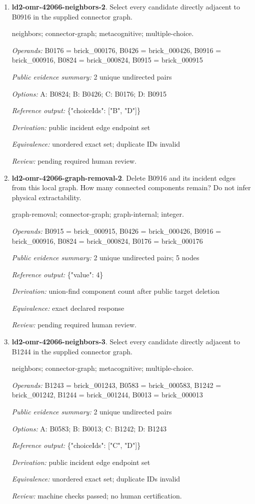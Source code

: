 \begin{enumerate}
\item \textbf{ld2-omr-42066-neighbors-2}. Select every candidate directly adjacent to B0916 in the supplied connector graph.
\par{\small neighbors; connector-graph; metacognitive; multiple-choice.\par\textit{Operands:} B0176 = brick\_000176, B0426 = brick\_000426, B0916 = brick\_000916, B0824 = brick\_000824, B0915 = brick\_000915\par\textit{Public evidence summary:} 2 unique undirected pairs\par\textit{Options:} A: B0824; B: B0426; C: B0176; D: B0915\par\textit{Reference output:} \{"choiceIds": ["B", "D"]\}\par\textit{Derivation:} public incident edge endpoint set\par\textit{Equivalence:} unordered exact set; duplicate IDs invalid\par\textit{Review:} pending required human review.}
\item \textbf{ld2-omr-42066-graph-removal-2}. Delete B0916 and its incident edges from this local graph. How many connected components remain? Do not infer physical extractability.
\par{\small graph-removal; connector-graph; graph-internal; integer.\par\textit{Operands:} B0915 = brick\_000915, B0426 = brick\_000426, B0916 = brick\_000916, B0824 = brick\_000824, B0176 = brick\_000176\par\textit{Public evidence summary:} 2 unique undirected pairs; 5 nodes\par\textit{Reference output:} \{"value": 4\}\par\textit{Derivation:} union-find component count after public target deletion\par\textit{Equivalence:} exact declared response\par\textit{Review:} pending required human review.}
\item \textbf{ld2-omr-42066-neighbors-3}. Select every candidate directly adjacent to B1244 in the supplied connector graph.
\par{\small neighbors; connector-graph; metacognitive; multiple-choice.\par\textit{Operands:} B1243 = brick\_001243, B0583 = brick\_000583, B1242 = brick\_001242, B1244 = brick\_001244, B0013 = brick\_000013\par\textit{Public evidence summary:} 2 unique undirected pairs\par\textit{Options:} A: B0583; B: B0013; C: B1242; D: B1243\par\textit{Reference output:} \{"choiceIds": ["C", "D"]\}\par\textit{Derivation:} public incident edge endpoint set\par\textit{Equivalence:} unordered exact set; duplicate IDs invalid\par\textit{Review:} machine checks passed; no human certification.}

\end{enumerate}
